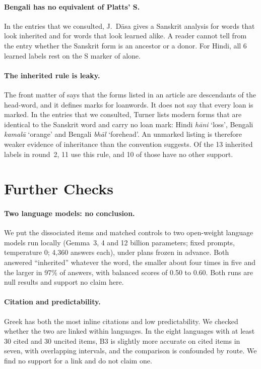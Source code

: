 \documentclass[11pt]{article}
\newcommand{\gl}[1]{`#1'}
\begin{document}
\paragraph{Bengali has no equivalent of Platts' S.} In the entries that we consulted, J.~D\=asa gives a Sanskrit analysis for words that look inherited and for words that look learned alike. A reader cannot tell from the entry whether the Sanskrit form is an ancestor or a donor. For Hindi, all 6 learned labels rest on the S marker of \citet{platts1884} alone.

\paragraph{The inherited rule is leaky.} The front matter of \citet{turner1966cdial} says that the forms listed in an article are descendants of the head-word, and it defines marks for loanwords. It does not say that every loan is marked. In the entries that we consulted, Turner lists modern forms that are identical to the Sanskrit word and carry no loan mark: Hindi \textit{h\=ani} \gl{loss}, Bengali \textit{kamal\=a} \gl{orange} and Bengali \textit{bh\=al} \gl{forehead}. An unmarked listing is therefore weaker evidence of inheritance than the convention suggests. Of the 13 inherited labels in round~2, 11 use this rule, and 10 of those have no other support.

\section{Further Checks}
\label{app:further}

\paragraph{Two language models: no conclusion.} We put the dissociated items and matched controls to two open-weight language models run locally (Gemma~3, 4 and 12 billion parameters; fixed prompts, temperature 0; 4,360 answers each), under plans frozen in advance. Both answered ``inherited'' whatever the word, the smaller about four times in five and the larger in 97\% of answers, with balanced scores of 0.50 to 0.60. Both runs are null results and support no claim here.

\paragraph{Citation and predictability.} Greek has both the most inline citations and low predictability. We checked whether the two are linked within languages. In the eight languages with at least 30 cited and 30 uncited items, B3 is slightly more accurate on cited items in seven, with overlapping intervals, and the comparison is confounded by route. We find no support for a link and do not claim one.
\end{document}
